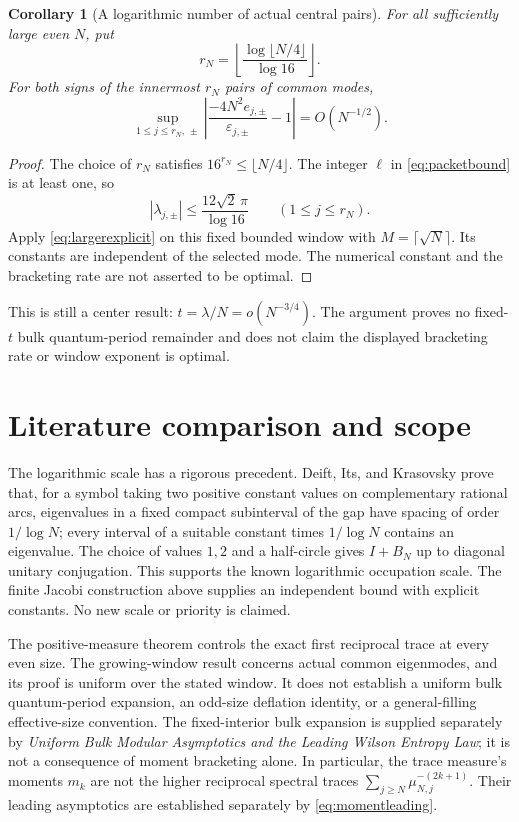 \documentclass[10pt]{article}
\newtheorem{corollary}[theorem]{Corollary}
\begin{document}
\begin{corollary}[A logarithmic number of actual central pairs]
For all sufficiently large even $N$, put
\[
r_N=\left\lfloor
\frac{\log\lfloor N/4\rfloor}{\log16}
\right\rfloor.
\]
For both signs of the innermost $r_N$ pairs of common modes,
\[
\sup_{1\le j\le r_N,\,\pm}
\left|\frac{-4N^2e_{j,\pm}}{\varepsilon_{j,\pm}}-1\right|
=O(N^{-1/2}).
\]
\end{corollary}
\begin{proof}
The choice of $r_N$ satisfies $16^{r_N}\le\lfloor N/4\rfloor$.
The integer $\ell$ in \eqref{eq:packetbound} is at least one, so
\[
|\lambda_{j,\pm}|\le\frac{12\sqrt2\,\pi}{\log16}
\qquad(1\le j\le r_N).
\]
Apply \eqref{eq:largerexplicit} on this fixed bounded window with
$M=\lceil\sqrt N\rceil$. Its constants are independent of the
selected mode. The numerical constant and the bracketing rate
are not asserted to be optimal.
\end{proof}
This is still a center result:
$t=\lambda/N=o(N^{-3/4})$. The argument proves no fixed-$t$
bulk quantum-period remainder and does not claim the displayed
bracketing rate or window exponent is optimal.

\section{Literature comparison and scope}
The logarithmic scale has a rigorous precedent. Deift, Its, and
Krasovsky \cite[Theorem 1.3]{dik} prove that, for a symbol taking two
positive constant values on complementary rational arcs, eigenvalues
in a fixed compact subinterval of the gap have spacing of order
$1/\log N$; every interval of a suitable constant times $1/\log N$
contains an eigenvalue. The choice of values $1,2$ and a half-circle
gives $I+B_N$ up to diagonal unitary conjugation. This supports the
known logarithmic occupation scale. The finite Jacobi construction
above supplies an independent bound with explicit constants. No new
scale or priority is claimed.

The positive-measure theorem controls the exact first reciprocal trace
at every even size. The growing-window result concerns actual common
eigenmodes, and its proof is uniform over the stated window. It does
not establish a uniform bulk quantum-period expansion, an odd-size
deflation identity, or a general-filling effective-size convention. The fixed-interior bulk expansion is supplied separately by \emph{Uniform Bulk Modular Asymptotics and the Leading Wilson Entropy Law}; it is not a consequence of moment bracketing alone.
In particular, the trace measure's moments $m_k$ are not the higher
reciprocal spectral traces $\sum_{j\ge N}\mu_{N,j}^{-(2k+1)}$.
Their leading asymptotics are established separately by \eqref{eq:momentleading}.
\end{document}
